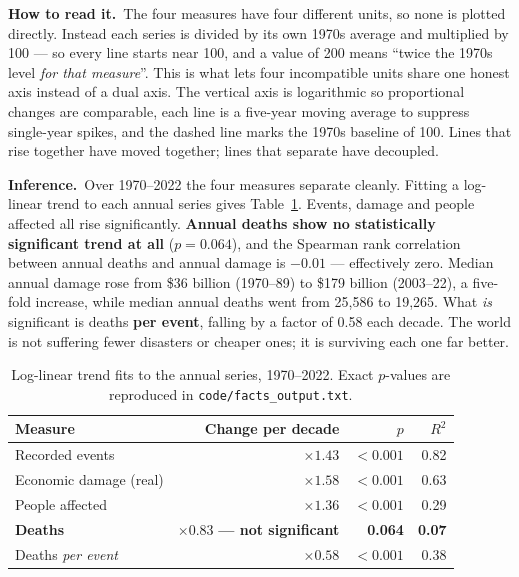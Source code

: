 \documentclass[11pt,a4paper]{article}
\newcommand{\inference}{\textbf{Inference.}\ }
\newcommand{\howto}{\textbf{How to read it.}\ }
\begin{document}
\howto The four measures have four different units, so none is plotted
directly. Instead each series is divided by its own 1970s average and multiplied
by 100 --- so every line starts near 100, and a value of 200 means ``twice the
1970s level \emph{for that measure}''. This is what lets four incompatible units
share one honest axis instead of a dual axis. The vertical axis is logarithmic so
proportional changes are comparable, each line is a five-year moving average to
suppress single-year spikes, and the dashed line marks the 1970s baseline of 100.
Lines that rise together have moved together; lines that separate have decoupled.

\inference Over 1970--2022 the four measures separate cleanly. Fitting a
log-linear trend to each annual series gives Table~\ref{tab:trends}. Events,
damage and people affected all rise significantly. \textbf{Annual deaths show no
statistically significant trend at all} ($p = 0.064$), and the Spearman rank
correlation between annual deaths and annual damage is $\mathbf{-0.01}$ ---
effectively zero. Median annual damage rose from \$36 billion (1970--89) to
\$179 billion (2003--22), a five-fold increase, while median annual deaths went
from 25{,}586 to 19{,}265. What \emph{is} significant is deaths \textbf{per
event}, falling by a factor of 0.58 each decade. The world is not suffering fewer
disasters or cheaper ones; it is surviving each one far better.

\begin{table}[H]
\centering
\caption{Log-linear trend fits to the annual series, 1970--2022. Exact
$p$-values are reproduced in \texttt{code/facts\_output.txt}.}
\label{tab:trends}
\small
\begin{tabular}{@{}l r r r@{}}
\toprule
\textbf{Measure} & \textbf{Change per decade} & \textbf{$p$} & \textbf{$R^2$}\\
\midrule
Recorded events        & $\times 1.43$ & $< 0.001$ & 0.82\\
Economic damage (real) & $\times 1.58$ & $< 0.001$ & 0.63\\
People affected        & $\times 1.36$ & $< 0.001$ & 0.29\\
\textbf{Deaths}        & $\mathbf{\times 0.83}$ \textbf{--- not significant} & \textbf{0.064} & \textbf{0.07}\\
Deaths \emph{per event}& $\times 0.58$ & $< 0.001$ & 0.38\\
\bottomrule
\end{tabular}
\end{table}
\end{document}

